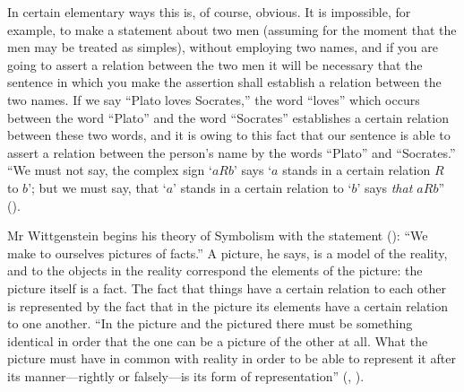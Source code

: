 In certain elementary ways this is, of course, obvious.
It is impossible, for example, to make a statement about
two men (assuming for the moment that the men may
be treated as simples), without employing two names, and
if you are going to assert a relation between the two men
it will be necessary that the sentence in which you make
the assertion shall establish a relation between the two
names. If we say ``Plato loves Socrates,'' the word
``loves'' which occurs between the word ``Plato'' and the
word ``Socrates'' establishes a certain relation between
these two words, and it is owing to this fact that our
sentence is able to assert a relation between the person's
name by the words ``Plato'' and ``Socrates.'' ``We must
not say, the complex sign `$a R b$' says `$a$ stands in a
certain relation $R$ to $b$'; but we must say, that `$a$'
stands in a certain relation to `$b$' says \emph{that $a R b$}''
().

Mr Wittgenstein begins his theory of Symbolism with
the statement (): ``We make to ourselves pictures of
facts.'' A picture, he says, is a model of the reality, and
to the objects in the reality correspond the elements of
the picture: the picture itself is a fact. The fact that
things have a certain relation to each other is represented
by the fact that in the picture its elements have a certain
relation to one another. ``In the picture and the pictured
there must be something identical in order that the one
can be a picture of the other at all. What the picture
must have in common with reality in order to be able
to represent it after its manner---rightly or falsely---is its
form of representation'' (, ).

